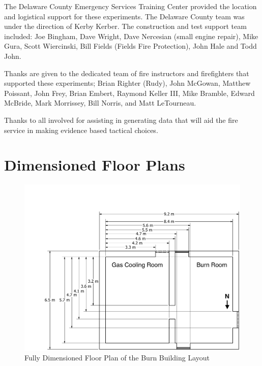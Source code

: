 \documentclass[12pt,oneside]{book}
\begin{document}
The Delaware County Emergency Services Training Center provided the location and logistical support for these experiments. The Delaware County team was under the direction of Kerby Kerber.  The construction and test support team included: Joe Bingham, Dave Wright, Dave Nercesian (small engine repair), Mike Gura, Scott Wiercinski, Bill Fields (Fields Fire Protection), John Hale and Todd John.

Thanks are given to the dedicated team of fire instructors and firefighters that supported these experiments; Brian Righter (Rudy), John McGowan, Matthew Poissant, John Frey, Brian Embert, Raymond Keller III, Mike Bramble, Edward McBride, Mark Morrissey, Bill Norris, and Matt LeTourneau.

Thanks to all involved for assisting in generating data that will aid the fire service in making evidence based tactical choices.



\appendix

\chapter{Dimensioned Floor Plans}
\label{app:floor_plans}

\begin{figure}[!ht]
	\includegraphics[width=\columnwidth]{../Figures/Floor_Plans/PDFs/West_Structure/DelCo_2012_West_Structure_Detailed}
	\caption{Fully Dimensioned Floor Plan of the Burn Building Layout}
	\label{fig:Delaware_County,_PA_Burn_Building_Layout_Detailed}
\end{figure}
\end{document}
